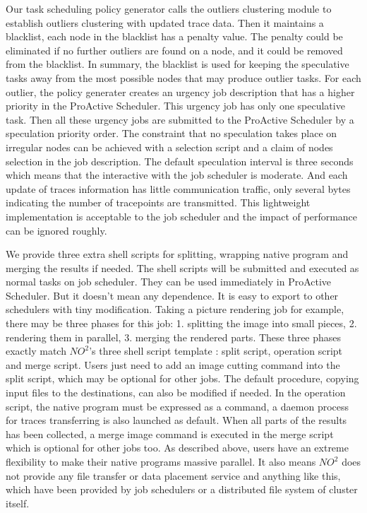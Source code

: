 Our task scheduling policy generator calls the outliers clustering module to establish
outliers clustering with updated trace data. Then it maintains a blacklist, each
node in the blacklist has a penalty value. The penalty could be eliminated if no further
outliers are found on a node, and it could be removed from the blacklist. In summary, the
blacklist is used for keeping the speculative tasks away from the most possible nodes that
may produce outlier tasks. For each outlier, the policy generater creates an urgency job
description that has a higher priority in the ProActive Scheduler. This urgency job has
only one speculative task. Then all these urgency jobs are submitted to the ProActive
Scheduler by a speculation priority order. The constraint that no speculation takes place
on irregular nodes can be achieved with a selection script and a claim of nodes selection
in the job description. The default speculation interval is three seconds which means that the
interactive with the job scheduler is moderate. And each update of traces information has
little communication traffic, only several bytes indicating the number of tracepoints are
transmitted. This lightweight implementation is acceptable to the job scheduler and the
impact of performance can be ignored roughly.

We provide three extra shell scripts for splitting, wrapping native program and merging
the results if needed. The shell scripts will be submitted and executed as normal tasks on
job scheduler. They can be used immediately in ProActive Scheduler. But it doesn't mean
any dependence. It is easy to export to other schedulers with tiny modification. Taking a
picture rendering job for example, there may be three phases for this job: 1. splitting
the image into small pieces, 2. rendering them in parallel, 3. merging the rendered parts.
These three phases exactly match $NO^2$'s three shell script template : split script,
operation script and merge script. Users just need to add an image cutting command into
the split script, which may be optional for other jobs. The default procedure, copying
input files to the destinations, can also be modified if needed. In the operation script,
the native program must be expressed as a command, a daemon process for traces
transferring is also launched as default. When all parts of the results has been
collected, a merge image command is executed in the merge script which is optional for other jobs
too. As described above,  users have an extreme flexibility to make their native programs
massive parallel. It also means $NO^2$ does not provide any file transfer or
data placement service and anything like this, which have been provided by job schedulers or a
distributed file system of cluster itself.

